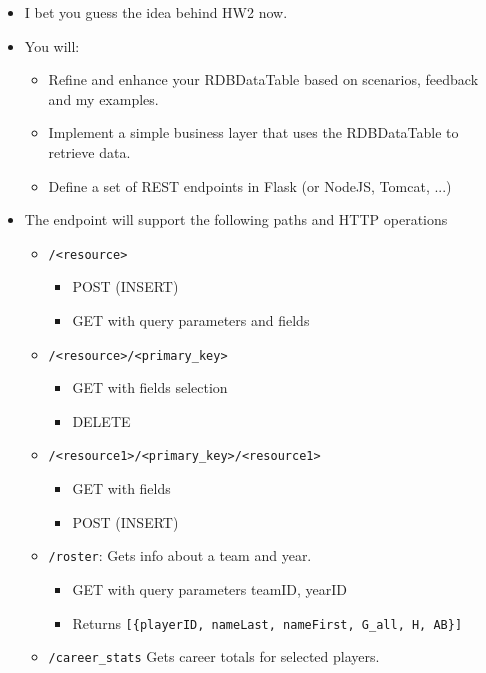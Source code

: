 \documentclass[11pt]{article}
\providecommand{\tightlist}{%
      \setlength{\itemsep}{0pt}\setlength{\parskip}{0pt}}
\begin{document}
    \begin{itemize}
\item
  I bet you guess the idea behind HW2 now.
\item
  You will:

  \begin{itemize}
  \tightlist
  \item
    Refine and enhance your RDBDataTable based on scenarios, feedback
    and my examples.
  \item
    Implement a simple business layer that uses the RDBDataTable to
    retrieve data.
  \item
    Define a set of REST endpoints in Flask (or NodeJS, Tomcat, ...)
  \end{itemize}
\item
  The endpoint will support the following paths and HTTP operations

  \begin{itemize}
  \tightlist
  \item
    \texttt{/\textless{}resource\textgreater{}}

    \begin{itemize}
    \tightlist
    \item
      POST (INSERT)
    \item
      GET with query parameters and fields
    \end{itemize}
  \item
    \texttt{/\textless{}resource\textgreater{}/\textless{}primary\_key\textgreater{}}

    \begin{itemize}
    \tightlist
    \item
      GET with fields selection
    \item
      DELETE
    \end{itemize}
  \item
    \texttt{/\textless{}resource1\textgreater{}/\textless{}primary\_key\textgreater{}/\textless{}resource1\textgreater{}}

    \begin{itemize}
    \tightlist
    \item
      GET with fields
    \item
      POST (INSERT)
    \end{itemize}
  \item
    \texttt{/roster}: Gets info about a team and year.

    \begin{itemize}
    \tightlist
    \item
      GET with query parameters teamID, yearID
    \item
      Returns
      \texttt{{[}\{playerID,\ nameLast,\ nameFirst,\ G\_all,\ H,\ AB\}{]}}
    \end{itemize}
  \item
    \texttt{/career\_stats} Gets career totals for selected players.


\end{itemize}
\end{itemize}
\end{document}
